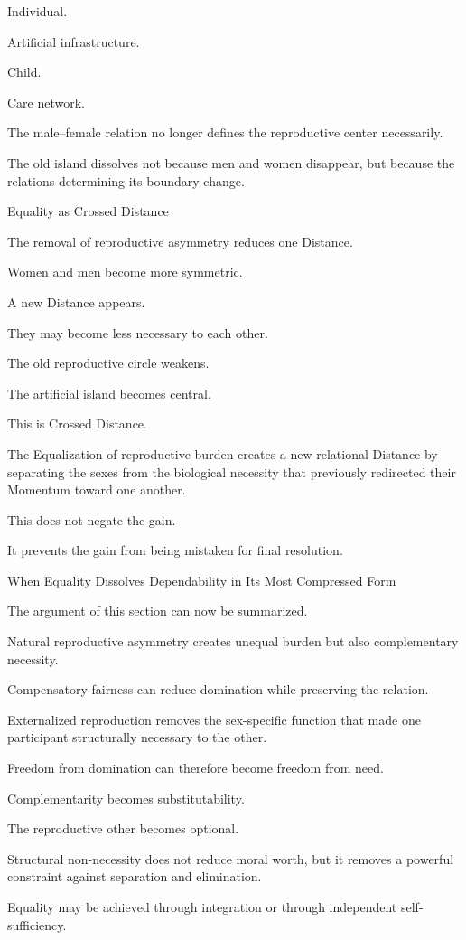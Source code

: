 Individual.

Artificial infrastructure.

Child.

Care network.

The male–female relation no longer defines the reproductive center necessarily.

The old island dissolves not because men and women disappear, but because the relations determining its boundary change.

Equality as Crossed Distance

The removal of reproductive asymmetry reduces one Distance.

Women and men become more symmetric.

A new Distance appears.

They may become less necessary to each other.

The old reproductive circle weakens.

The artificial island becomes central.

This is Crossed Distance.

The Equalization of reproductive burden creates a new relational Distance by separating the sexes from the biological necessity that previously redirected their Momentum toward one another.

This does not negate the gain.

It prevents the gain from being mistaken for final resolution.

When Equality Dissolves Dependability in Its Most Compressed Form

The argument of this section can now be summarized.

Natural reproductive asymmetry creates unequal burden but also complementary necessity.

Compensatory fairness can reduce domination while preserving the relation.

Externalized reproduction removes the sex-specific function that made one participant structurally necessary to the other.

Freedom from domination can therefore become freedom from need.

Complementarity becomes substitutability.

The reproductive other becomes optional.

Structural non-necessity does not reduce moral worth, but it removes a powerful constraint against separation and elimination.

Equality may be achieved through integration or through independent self-sufficiency.


